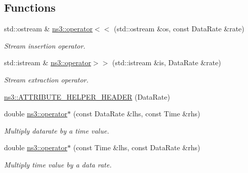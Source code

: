\subsection*{Functions}
\begin{DoxyCompactItemize}
\item 
std\+::ostream \& \hyperlink{namespacens3_a75cc796d7ece809ccee8456ff1efeb14}{ns3\+::operator$<$$<$} (std\+::ostream \&os, const Data\+Rate \&rate)
\begin{DoxyCompactList}\small\item\em Stream insertion operator. \end{DoxyCompactList}\item 
std\+::istream \& \hyperlink{namespacens3_aece48f62b5ebf9aca1e78f8c3b0f069f}{ns3\+::operator$>$$>$} (std\+::istream \&is, Data\+Rate \&rate)
\begin{DoxyCompactList}\small\item\em Stream extraction operator. \end{DoxyCompactList}\item 
\hyperlink{namespacens3_a4645f6d1c97b6add22b2c3ce0e96979b}{ns3\+::\+A\+T\+T\+R\+I\+B\+U\+T\+E\+\_\+\+H\+E\+L\+P\+E\+R\+\_\+\+H\+E\+A\+D\+ER} (Data\+Rate)
\item 
double \hyperlink{namespacens3_a04d08a98ce4211ac9cf750b882126661}{ns3\+::operator$\ast$} (const Data\+Rate \&lhs, const Time \&rhs)
\begin{DoxyCompactList}\small\item\em Multiply datarate by a time value. \end{DoxyCompactList}\item 
double \hyperlink{namespacens3_a3f9862187d3a93e502f0548b4f6489c8}{ns3\+::operator$\ast$} (const Time \&lhs, const Data\+Rate \&rhs)
\begin{DoxyCompactList}\small\item\em Multiply time value by a data rate. \end{DoxyCompactList}\end{DoxyCompactItemize}
